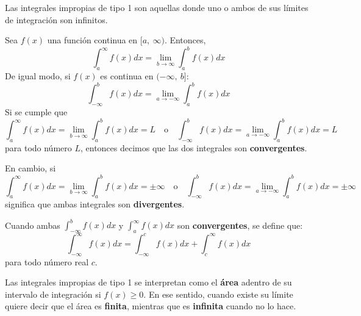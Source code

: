 \documentclass[12pt]{article}
\begin{document}
Las integrales impropias de tipo 1 son aquellas donde uno o ambos de sus límites de integración son infinitos.

Sea $f(x)$ una función continua en $[a, \ \infty)$. Entonces,
\[
  \int_{a}^{\infty} f(x)dx = \lim_{b \to \infty} \int_{a}^{b} f(x)dx
\]
De igual modo, si $f(x)$ es continua en $(-\infty, \ b]$:
\[
  \int_{-\infty}^{b} f(x)dx = \lim_{a \to -\infty} \int_{a}^{b} f(x)dx
\]
Si se cumple que
\[
  \int_{a}^{\infty} f(x)dx = \lim_{b \to \infty} \int_{a}^{b} f(x)dx = L \quad \text{o} \quad
  \int_{-\infty}^{b} f(x)dx = \lim_{a \to -\infty} \int_{a}^{b} f(x)dx = L
\]
para todo número $L$, entonces decimos que las dos integrales son \textbf{convergentes}.

En cambio, si
\[
  \int_{a}^{\infty} f(x)dx = \lim_{b \to \infty} \int_{a}^{b} f(x)dx = \pm \infty \quad \text{o} \quad
  \int_{-\infty}^{b} f(x)dx = \lim_{a \to -\infty} \int_{a}^{b} f(x)dx = \pm \infty
\]
significa que ambas integrales son \textbf{divergentes}.

Cuando ambas $\int_{-\infty}^{b} f(x)dx$ y $\int_{a}^{\infty} f(x)dx$ son \textbf{convergentes}, se define que:
\[
  \int_{-\infty}^{\infty} f(x)dx = \int_{-\infty}^{c} f(x)dx + \int_{c}^{\infty} f(x)dx
\]
para todo número real $c$.

Las integrales impropias de tipo 1 se interpretan como el \textbf{área} adentro de su intervalo de integración si $f(x) \geq 0$. En ese sentido, cuando existe su límite quiere decir que el área es \textbf{finita}, mientras que es \textbf{infinita} cuando no lo hace.
\end{document}
